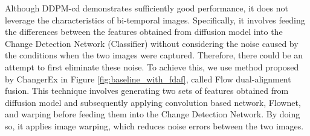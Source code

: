 \documentclass[../main.tex]{subfiles}
\begin{document}
Although DDPM-cd demonstrates sufficiently good performance, it does not leverage the characteristics of bi-temporal images. Specifically, it involves feeding the differences between the features obtained from diffusion model into the Change Detection Network (Classifier) without considering the noise caused by the conditions when the two images were captured. Therefore, there could be an attempt to first eliminate these noise. To achieve this, we use method proposed by ChangerEx in Figure \ref{fig:baseline_with_fdaf}, called Flow dual-alignment fusion\cite{fang2023changerex}. This technique involves generating two sets of features obtained from diffusion model and subsequently applying convolution based network, Flownet, and warping before feeding them into the Change Detection Network. By doing so, it applies image warping, which reduces noise errors between the two images.
\end{document}
